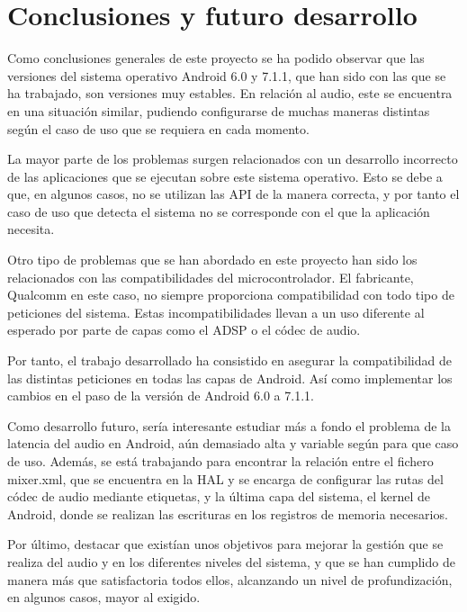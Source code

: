 \chapter{Conclusiones y futuro desarrollo}
Como conclusiones generales de este proyecto se ha podido observar que las versiones del sistema operativo Android 6.0 y 7.1.1, que han sido con las que se ha trabajado, son versiones muy estables. En relación al audio, este se encuentra en una situación similar, pudiendo configurarse de muchas maneras distintas según el caso de uso que se requiera en cada momento.

La mayor parte de los problemas surgen relacionados con un desarrollo incorrecto de las aplicaciones que se ejecutan sobre este sistema operativo. Esto se debe a que, en algunos casos, no se utilizan las \gls{API} de la manera correcta, y por tanto el caso de uso que detecta el sistema no se corresponde con el que la aplicación necesita.

Otro tipo de problemas que se han abordado en este proyecto han sido los relacionados con las compatibilidades del microcontrolador. El fabricante, Qualcomm en este caso, no siempre proporciona compatibilidad con todo tipo de peticiones del sistema. Estas incompatibilidades llevan a un uso diferente al esperado por parte de capas como el \gls{ADSP} o el códec de audio.

Por tanto, el trabajo desarrollado ha consistido en asegurar la compatibilidad de las distintas peticiones en todas las capas de Android. Así como implementar los cambios en el paso de la versión de Android 6.0 a 7.1.1.

Como desarrollo futuro, sería interesante estudiar más a fondo el problema de la latencia del audio en Android, aún demasiado alta y variable según para que caso de uso. Además, se está trabajando para encontrar la relación entre el fichero mixer.xml, que se encuentra en la \gls{HAL} y se encarga de configurar las rutas del códec de audio mediante etiquetas, y la última capa del sistema, el kernel de Android, donde se realizan las escrituras en los registros de memoria necesarios.

Por último, destacar que existían unos objetivos para mejorar la gestión que se realiza del audio y en los diferentes niveles del sistema, y que se han cumplido de manera más que satisfactoria todos ellos, alcanzando un nivel de profundización, en algunos casos, mayor al exigido.



